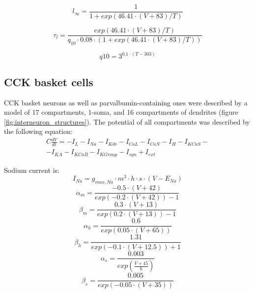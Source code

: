 \documentclass[a4paper,12pt]{article}
\begin{document}
\begin{equation}
l_{\infty} = \frac{1}{1 + exp(46.41 \cdot  (V + 83)/T)}
\end{equation}

\begin{equation}
\tau_l = \frac{exp(46.41 \cdot  (V + 83)/T) }
{q_{10} \cdot 0.08 \cdot (1 + exp(46.41 \cdot  (V + 83)/T))}
\end{equation}

\begin{equation}
q10 = 3^{0.1\cdot (T - 303) } 
\end{equation}


\subsection{CCK basket cells}
CCK basket neurons as well as parvalbumin-containing ones were described by a model of 17 compartments, 1-soma, and 16 compartments of dendrites (figure \ref{fig:interneuron_structures}). The potential of all compartments was described by the following equation:
\begin{eqnarray}
C\frac{dV}{dt}=-I_L-I_{Na}-I_{Kdr}-I_{CaL}-I_{CaN}-I_{H}-I_{KCaS}- \nonumber \\
-I_{KA}-I_{KCaB}-I_{KGroup}-I_{syn} + I_{ext}
\end{eqnarray}

Sodium current is:
\begin{equation}
\label{eq:Navcck}
I_{Na} = g_{max, Na} \cdot m^3 \cdot h \cdot s \cdot (V - E_{Na})
\end{equation}
\begin{equation}
\alpha_m = \frac{-0.5 \cdot (V + 42)}{exp(-0.2\cdot(V+42)) - 1}
\end{equation}
\begin{equation}
\beta_m = \frac{0.3 \cdot (V + 13)}{exp(0.2\cdot(V+13)) - 1}
\end{equation}
\begin{equation}
\alpha_h = \frac{0.6}{exp(0.05\cdot(V+65))}
\end{equation}
\begin{equation}
\beta_h = \frac{1.31}{exp(-0.1\cdot(V+12.5)) + 1}
\end{equation}
\begin{equation}
\alpha_s = \frac{0.003}{exp( \frac{V+45}{6})}
\end{equation}
\begin{equation}
\beta_s = \frac{0.005}{exp(-0.05\cdot(V+35))}
\end{equation}
\end{document}
